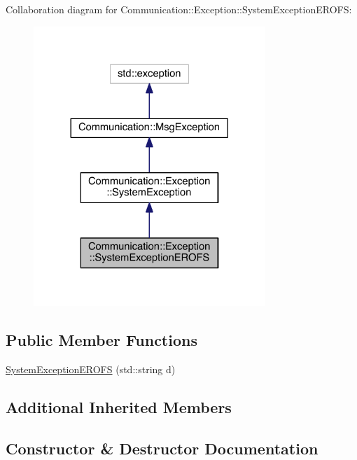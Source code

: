 Collaboration diagram for Communication\+:\+:Exception\+:\+:System\+Exception\+E\+R\+O\+F\+S\+:\nopagebreak
\begin{figure}[H]
\begin{center}
\leavevmode
\includegraphics[width=248pt]{class_communication_1_1_exception_1_1_system_exception_e_r_o_f_s__coll__graph}
\end{center}
\end{figure}
\subsection*{Public Member Functions}
\begin{DoxyCompactItemize}
\item 
\hyperlink{class_communication_1_1_exception_1_1_system_exception_e_r_o_f_s_a5985e24ce464b63f8a142c0e5bd9e0e7}{System\+Exception\+E\+R\+O\+F\+S} (std\+::string d)
\end{DoxyCompactItemize}
\subsection*{Additional Inherited Members}


\subsection{Constructor \& Destructor Documentation}
\hypertarget{class_communication_1_1_exception_1_1_system_exception_e_r_o_f_s_a5985e24ce464b63f8a142c0e5bd9e0e7}{}
